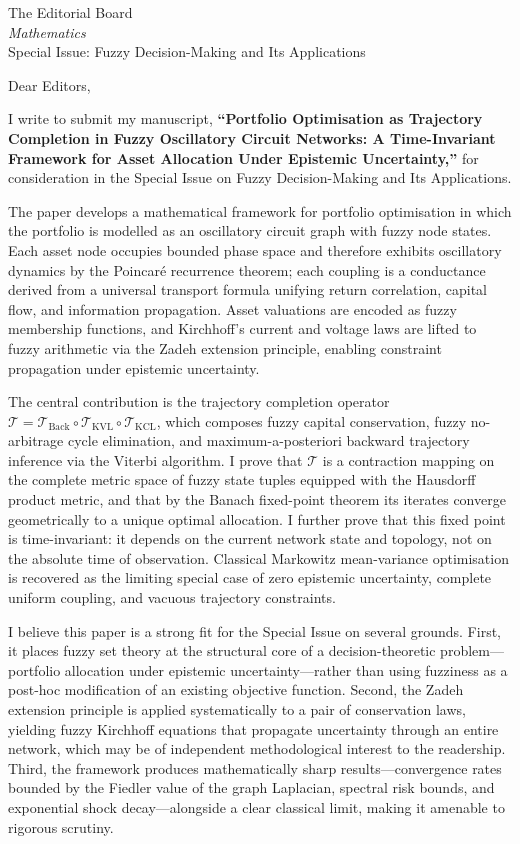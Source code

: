 \documentclass[11pt]{letter}
\begin{document}
\begin{letter}{The Editorial Board\\
\textit{Mathematics}\\
Special Issue: Fuzzy Decision-Making and Its Applications}

\opening{Dear Editors,}

I write to submit my manuscript, \textbf{``Portfolio Optimisation as Trajectory Completion in Fuzzy Oscillatory Circuit Networks: A Time-Invariant Framework for Asset Allocation Under Epistemic Uncertainty,''} for consideration in the Special Issue on Fuzzy Decision-Making and Its Applications.

The paper develops a mathematical framework for portfolio optimisation in which the portfolio is modelled as an oscillatory circuit graph with fuzzy node states. Each asset node occupies bounded phase space and therefore exhibits oscillatory dynamics by the Poincaré recurrence theorem; each coupling is a conductance derived from a universal transport formula unifying return correlation, capital flow, and information propagation. Asset valuations are encoded as fuzzy membership functions, and Kirchhoff's current and voltage laws are lifted to fuzzy arithmetic via the Zadeh extension principle, enabling constraint propagation under epistemic uncertainty.

The central contribution is the trajectory completion operator $\mathcal{T} = \mathcal{T}_{\mathrm{Back}} \circ \mathcal{T}_{\mathrm{KVL}} \circ \mathcal{T}_{\mathrm{KCL}}$, which composes fuzzy capital conservation, fuzzy no-arbitrage cycle elimination, and maximum-a-posteriori backward trajectory inference via the Viterbi algorithm. I prove that $\mathcal{T}$ is a contraction mapping on the complete metric space of fuzzy state tuples equipped with the Hausdorff product metric, and that by the Banach fixed-point theorem its iterates converge geometrically to a unique optimal allocation. I further prove that this fixed point is time-invariant: it depends on the current network state and topology, not on the absolute time of observation. Classical Markowitz mean-variance optimisation is recovered as the limiting special case of zero epistemic uncertainty, complete uniform coupling, and vacuous trajectory constraints.

I believe this paper is a strong fit for the Special Issue on several grounds. First, it places fuzzy set theory at the structural core of a decision-theoretic problem---portfolio allocation under epistemic uncertainty---rather than using fuzziness as a post-hoc modification of an existing objective function. Second, the Zadeh extension principle is applied systematically to a pair of conservation laws, yielding fuzzy Kirchhoff equations that propagate uncertainty through an entire network, which may be of independent methodological interest to the readership. Third, the framework produces mathematically sharp results---convergence rates bounded by the Fiedler value of the graph Laplacian, spectral risk bounds, and exponential shock decay---alongside a clear classical limit, making it amenable to rigorous scrutiny.


\end{letter}
\end{document}
